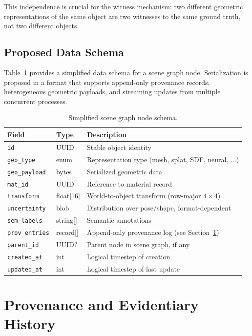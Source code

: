 \documentclass[12pt,a4paper]{article}
\theoremstyle{plain}
\theoremstyle{definition}
\theoremstyle{remark}
\begin{document}
This independence is crucial for the witness mechanism: two different geometric representations of the same object are two witnesses to the same ground truth, not two different objects.

\subsection{Proposed Data Schema}

Table~\ref{tab:schema} provides a simplified data schema for a scene graph node. Serialization is proposed in a format that supports append-only provenance records, heterogeneous geometric payloads, and streaming updates from multiple concurrent processes.

\begin{table}[h]
\centering
\caption{Simplified scene graph node schema.}
\label{tab:schema}
\begin{tabular}{lll}
\toprule
Field & Type & Description \\
\midrule
\texttt{id} & UUID & Stable object identity \\
\texttt{geo\_type} & enum & Representation type (mesh, splat, SDF, neural, ...) \\
\texttt{geo\_payload} & bytes & Serialized geometric data \\
\texttt{mat\_id} & UUID & Reference to material record \\
\texttt{transform} & float[16] & World-to-object transform (row-major $4\times4$) \\
\texttt{uncertainty} & blob & Distribution over pose/shape, format-dependent \\
\texttt{sem\_labels} & string[] & Semantic annotations \\
\texttt{prov\_entries} & record[] & Append-only provenance log (see Section~\ref{sec:provenance}) \\
\texttt{parent\_id} & UUID? & Parent node in scene graph, if any \\
\texttt{created\_at} & int & Logical timestep of creation \\
\texttt{updated\_at} & int & Logical timestep of last update \\
\bottomrule
\end{tabular}
\end{table}

\section{Provenance and Evidentiary History}
\label{sec:provenance}
\end{document}
